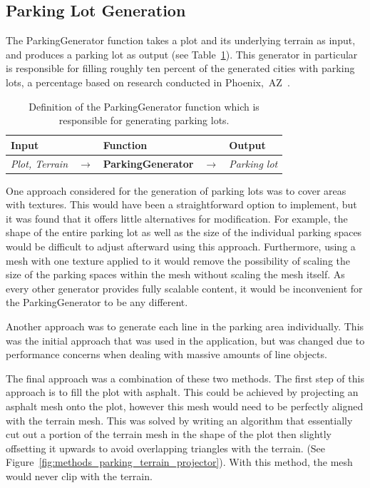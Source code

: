 \subsection{Parking Lot Generation}

The ParkingGenerator function takes a plot and its underlying terrain as input, and produces a parking lot as output (see Table~\ref{table:parking}).
This generator in particular is responsible for filling roughly ten percent of the generated cities with parking lots, a percentage based on research conducted in Phoenix,~AZ~\cite{parking_percent}.

\begin{table}[H]
   \centering
   \begin{tabular}{lllll}
     \textbf{Input}                           &               & \textbf{Function}            &               & \textbf{Output}         \\
     \midrule
     \textit{Plot, Terrain}                   & $\rightarrow$ & \textbf{ParkingGenerator}       & $\rightarrow$ & \textit{Parking lot}           \\
     \bottomrule
   \end{tabular}

   \caption{Definition of the ParkingGenerator function which is responsible for generating parking lots.}
   \label{table:parking}
 \end{table}
 \vspace{-0.4cm}

One approach considered for the generation of parking lots was to cover areas with textures.
This would have been a straightforward option to implement, but it was found that it offers little alternatives for modification.
For example, the shape of the entire parking lot as well as the size of the individual parking spaces would be difficult to adjust afterward using this approach.
Furthermore, using a mesh with one texture applied to it would remove the possibility of scaling the size of the parking spaces within the mesh without scaling the mesh itself.
As every other generator provides fully scalable content, it would be inconvenient for the ParkingGenerator to be any different.

Another approach was to generate each line in the parking area individually. 
This was the initial approach that was used in the application, but was changed due to performance concerns when dealing with massive amounts of line objects.

The final approach was a combination of these two methods.
The first step of this approach is to fill the plot with asphalt.
This could be achieved by projecting an asphalt mesh onto the plot, however this mesh would need to be perfectly aligned with the terrain mesh.
This was solved by writing an algorithm that essentially cut out a portion of the terrain mesh in the shape of the plot then slightly offsetting it upwards to avoid overlapping triangles with the terrain. (See Figure~\ref{fig:methods_parking_terrain_projector}).
With this method, the mesh would never clip with the terrain.

